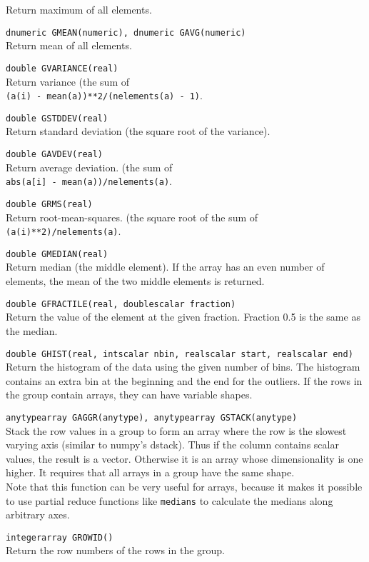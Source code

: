 \begin{description}
    Return maximum of all elements.
  \item[] \texttt{dnumeric GMEAN(numeric), dnumeric GAVG(numeric)}\\
    Return mean of all elements.
  \item[] \texttt{double GVARIANCE(real)}\\
    Return variance (the sum of
    \\\texttt{(a(i) - mean(a))**2/(nelements(a) - 1)}.
  \item[] \texttt{double GSTDDEV(real)}\\
    Return standard deviation (the square root of the variance).
  \item[] \texttt{double GAVDEV(real)}\\
    Return average deviation. (the sum of
    \\\texttt{abs(a[i] - mean(a))/nelements(a)}.
  \item[] \texttt{double GRMS(real)}\\
    Return root-mean-squares. (the square root of the sum of
    \\\texttt{(a(i)**2)/nelements(a)}.
  \item[] \texttt{double GMEDIAN(real)}\\
    Return median (the middle element).
    If the array has an even number of elements, the mean of
    the two middle elements is returned.
  \item[] \texttt{double GFRACTILE(real, doublescalar fraction)}\\
    Return the value of the element at the given fraction.
    Fraction 0.5 is the same as the median.
  \item[] \texttt{double GHIST(real, intscalar nbin, realscalar start,
    realscalar end)}\\
    Return the histogram of the data using the given number of bins.
    The histogram contains an extra bin at the beginning and the end
    for the outliers. If the rows in the group contain arrays, they
    can have variable shapes.
  \item[] \texttt{anytypearray GAGGR(anytype), anytypearray GSTACK(anytype)}\\
    Stack the row values in a group to form an array where the row is
    the slowest varying axis (similar to numpy's dstack). Thus if the
    column contains scalar values, the result is a vector. Otherwise
    it is an array whose dimensionality is one higher. It requires
    that all arrays in a group have the same shape.
    \\Note that this function can be very useful for arrays, because it
    makes it possible to use partial reduce functions like
    \texttt{medians} to calculate the medians along arbitrary axes.
  \item[] \texttt{integerarray GROWID()}\\
    Return the row numbers of the rows in the group.
\end{description}
